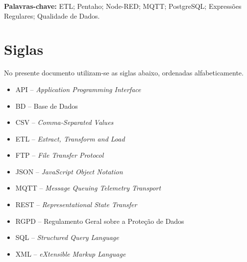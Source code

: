 \documentclass[11pt,a4paper]{article}
\begin{document}
\clearpage

\begin{abstract}
O presente relatório documenta o desenvolvimento de um processo de \textit{Extract, Transform and Load} (ETL) para a loja fictícia ISI Store. O problema consistiu na dispersão de dados por sistemas isolados: vendas em CSV, clientes em JSON, catálogo em XML, \textit{stock} em base de dados relacional PostgreSQL e catálogo externo via API REST. A solução foi implementada em Pentaho Data Integration, pela orquestração visual de transformações e \textit{jobs}. A abordagem seguiu uma metodologia de \textit{Design Science Research}, com análise do problema, conceção da arquitetura, implementação incremental e avaliação por contagens e \textit{previews}. Implementou-se extração multiformato, limpeza com expressões regulares, anonimização, junções e agregações, carga para \textit{Data Mart}, exportações CSV/JSON, notificações por correio eletrónico, transferência FTP e um painel complementar em Node-RED com MQTT. Obteve-se uma execução integral válida: 13 vendas reduziram-se a 10 limpas, 6 clientes a 2 válidos, 158 produtos integrados, 10 linhas carregadas em \texttt{dw\_vendas} e agregação por cidade (Braga 2077.47/3, Porto 949.98/2 e sem cliente 436.17/5). A contribuição principal é um processo reprodutível que combina integração \textit{batch}, qualidade de dados, anonimização e visualização quase em tempo real, cumprindo as três fases obrigatórias do enunciado.
\end{abstract}

\noindent\textbf{Palavras-chave:} ETL; Pentaho; Node-RED; MQTT; PostgreSQL; Expressões Regulares; Qualidade de Dados.

\section*{Siglas}
No presente documento utilizam-se as siglas abaixo, ordenadas alfabeticamente.
\begin{itemize}
\item API -- \textit{Application Programming Interface}
\item BD -- Base de Dados
\item CSV -- \textit{Comma-Separated Values}
\item ETL -- \textit{Extract, Transform and Load}
\item FTP -- \textit{File Transfer Protocol}
\item JSON -- \textit{JavaScript Object Notation}
\item MQTT -- \textit{Message Queuing Telemetry Transport}
\item REST -- \textit{Representational State Transfer}
\item RGPD -- Regulamento Geral sobre a Proteção de Dados
\item SQL -- \textit{Structured Query Language}
\item XML -- \textit{eXtensible Markup Language}
\end{itemize}
\end{document}
